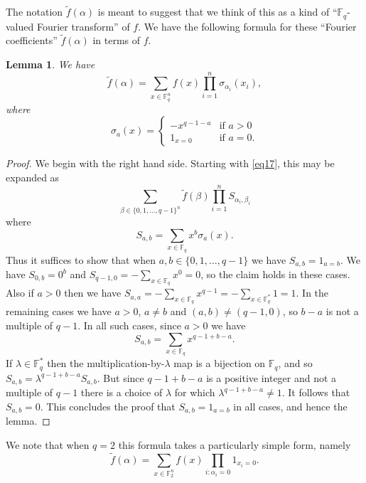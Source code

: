 \documentclass[12pt,reqno]{amsart}
\newtheorem{lemma}[theorem]{Lemma}
\theoremstyle{definition}
\def\F{\mathbb{F}}
\numberwithin{equation}{section}
\begin{document}
The notation $\tilde f(\alpha)$ is meant to suggest that we think of this as a kind of ``$\F_q$-valued Fourier transform'' of $f$. We have the following formula for these ``Fourier coefficients'' $\tilde f(\alpha)$ in terms of $f$.

\begin{lemma}\label{fourier-lem}
We have 
\[ \tilde f(\alpha) = \sum_{x \in \F_q^n}  f(x) \prod_{i = 1}^n \sigma_{\alpha_i}(x_i),\] where
\[ \sigma_a(x) = \left\{ \begin{array}{ll} -x^{q - 1 - a} & \mbox{if $a > 0$} \\ 1_{x = 0} & \mbox{if $a = 0$}.  \end{array} \right.\]
\end{lemma}
\begin{proof}
We begin with the right hand side.  Starting with \eqref{eq17}, this may be expanded as 
\[ \sum_{\beta \in \{0,1,\dots, q-1\}^n }\tilde f(\beta) \prod_{i = 1}^n S_{\alpha_i, \beta_i}\]
where
\[ S_{a,b} =  \sum_{x \in \F_q} x^b \sigma_a(x).\] Thus it suffices to show that when $a,b \in \{0,1,\dots, q-1\}$ we have $S_{a,b} = 1_{a = b}$. We have $S_{0,b} = 0^b$ and $S_{q-1, 0} = - \sum_{x \in \F_q} x^0 = 0$, so the claim holds in these cases. Also if $a > 0$ then we have $S_{a,a} = -\sum_{x \in \F_q} x^{q - 1} = -\sum_{x \in \F_q^*} 1 = 1$. In the remaining cases we have $a > 0$, $a \neq b$ and $(a,b) \neq (q-1, 0)$, so $b - a$ is not a multiple of $q - 1$. In all such cases, since $a > 0$ we have
  \[ S_{a,b} = \sum_{x \in \F_q} x^{q - 1 + b - a}.\] If $\lambda \in \F_q^*$ then the multiplication-by-$\lambda$ map is a bijection on $\F_q$, and so $S_{a,b} = \lambda^{q - 1 + b - a}S_{a,b}$. But since $q - 1 + b - a$ is a positive integer and not a multiple of $q - 1$ there is a choice of $\lambda$ for which $\lambda^{q - 1 + b - a} \neq 1$. It follows that $S_{a,b} = 0$. This concludes the proof that $S_{a,b} = 1_{a = b}$ in all cases, and hence the lemma.
\end{proof}

We note that when $q = 2$ this formula takes a particularly simple form, namely
\[ \tilde f(\alpha) = \sum_{x \in \F_2^n}  f(x) \prod_{i : \alpha_i = 0} 1_{x_i = 0}.\] 
\end{document}
